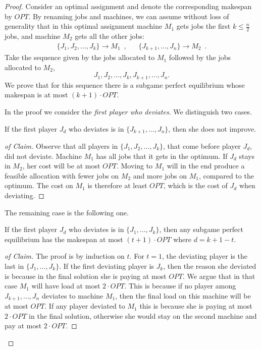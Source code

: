 \documentclass[runningheads]{llncs}
\begin{document}
\begin{proof}
Consider an optimal assignment and denote the corresponding makespan by $OPT$. By renaming jobs and machines, we can assume without loss of generality that in this optimal assignment machine $M_1$ gets jobs the first $k\leq \frac{n}{2}$ jobs, and machine $M_2$ gets all the other jobs:
\begin{align*}
\{J_1,J_2,\ldots, J_k\} \rightarrow M_1 \enspace,  && \{J_{k+1}, \ldots, J_n\} \rightarrow M_2 \enspace .
\end{align*}
Take the sequence given by the jobs allocated to $M_1$ followed by the jobs allocated to $M_2$, 
$$J_1, J_2, \ldots, J_k, J_{k+1},\ldots, J_n.$$ We prove that for this sequence there is a subgame perfect equilibrium whose makespan is at most $(k+1)\cdot OPT$. 

In the proof we consider the \emph{first player who deviates}. We distinguish two cases. 

\begin{claim}
	If the first player $J_d$ who deviates is in $\{J_{k+1}, \ldots, J_n\}$, then she does not improve. 
\end{claim}
\begin{proof}[of Claim]%
	Observe that all players in $\{J_1,J_2,\ldots, J_k\}$, that come before player $J_d$, did not deviate. Machine $M_1$ has all jobs that it gets in the optimum. If $J_d$ stays in $M_2$, her cost will be at most $OPT$. Moving to $M_1$ will in the end produce a feasible allocation with fewer jobs on $M_2$ and more jobs on $M_1$, compared to the optimum. The cost on $M_1$ is therefore at least $OPT$, which is the cost of $J_d$ when deviating.  
\end{proof}

The remaining  case is the following one.

\begin{claim}
	If the first player $J_d$ who deviates is in $\{J_{1}, \ldots, J_k\}$, then any subgame perfect equilibrium has the makespan at most $(t+1)\cdot OPT$ where $d=k+1-t$.
\end{claim} 
\begin{proof}[of Claim]%
	The proof is by induction on $t$. For $t=1$, the deviating player is the last in $\{J_{1}, \ldots, J_k\}$. If the first deviating player is $J_k$, then the reason she deviated is because in the final solution she is paying at most $OPT$. We argue that in that case $M_1$ will have load at most  $2\cdot OPT$. This is because if no player among $J_{k+1},\ldots, J_n$ deviates to machine $M_1$, then the final load on this machine will be at most $OPT$. If any player deviated to $M_1$ this is because she is paying at most $2\cdot OPT$ in the final solution, otherwise she would stay on the second machine and pay at most $2\cdot OPT$.
	

\end{proof}
\end{proof}
\end{document}
